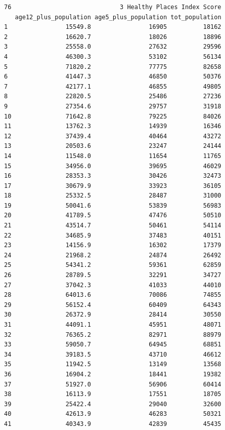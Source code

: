 \documentclass[
  letterpaper,
  DIV=11,
  numbers=noendperiod]{scrartcl}
\begin{document}
\begin{verbatim}
76                              3 Healthy Places Index Score
   age12_plus_population age5_plus_population tot_population
1                15549.8                16905          18162
2                16620.7                18026          18896
3                25558.0                27632          29596
4                46300.3                53102          56134
5                71820.2                77775          82658
6                41447.3                46850          50376
7                42177.1                46855          49805
8                22820.5                25486          27236
9                27354.6                29757          31918
10               71642.8                79225          84026
11               13762.3                14939          16346
12               37439.4                40464          43272
13               20503.6                23247          24144
14               11548.0                11654          11765
15               34956.0                39695          46029
16               28353.3                30426          32473
17               30679.9                33923          36105
18               25332.5                28487          31000
19               50041.6                53839          56983
20               41789.5                47476          50510
21               43514.7                50461          54114
22               34685.9                37483          40151
23               14156.9                16302          17379
24               21968.2                24874          26492
25               54341.2                59361          62859
26               28789.5                32291          34727
27               37042.3                41033          44010
28               64013.6                70086          74855
29               56152.4                60409          64343
30               26372.9                28414          30550
31               44091.1                45951          48071
32               76365.2                82971          88979
33               59050.7                64945          68851
34               39183.5                43710          46612
35               11942.5                13149          13568
36               16904.2                18441          19382
37               51927.0                56906          60414
38               16113.9                17551          18705
39               25422.4                29040          32600
40               42613.9                46283          50321
41               40343.9                42839          45435

\end{verbatim}
\end{document}
